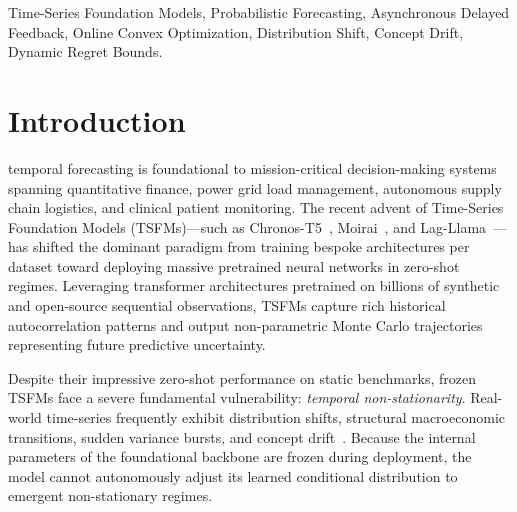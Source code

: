 \documentclass[10pt,journal,compsoc]{IEEEtran}
\begin{document}
{\begin{abstract}
RLS-TS). Evaluated through Continuous Ranked Probability Score (CRPS), Multivariate Energy Score, Variogram Score, and Circular Block Bootstrap significance testing ($B=1000, b \in \{5, 10, 20\}$), $H_3$ demonstrates statistically significant reductions in predictive error of up to 21.8\% under severe joint shifts. Furthermore, cross-architecture evaluations on Chronos-T5 and Moirai-1.0-R reveal a universal invariance: while unregularized mean tracking overfits high-frequency financial return noise, overlap-aware scale adaptation robustly improves Winkler interval coverage scores by up to 24.4\%.
\end{abstract}

\begin{IEEEkeywords}
Time-Series Foundation Models, Probabilistic Forecasting, Asynchronous Delayed Feedback, Online Convex Optimization, Distribution Shift, Concept Drift, Dynamic Regret Bounds.
\end{IEEEkeywords}}

\maketitle
\IEEEdisplaynontitleabstractindextext
\IEEEpeerreviewmaketitle

\section{Introduction}
 temporal forecasting is foundational to mission-critical decision-making systems spanning quantitative finance, power grid load management, autonomous supply chain logistics, and clinical patient monitoring. The recent advent of Time-Series Foundation Models (TSFMs)---such as Chronos-T5~\cite{ansari2024chronos}, Moirai~\cite{garza2023timegpt}, and Lag-Llama~\cite{rasul2023lagllama}---has shifted the dominant paradigm from training bespoke architectures per dataset toward deploying massive pretrained neural networks in zero-shot regimes. Leveraging transformer architectures pretrained on billions of synthetic and open-source sequential observations, TSFMs capture rich historical autocorrelation patterns and output non-parametric Monte Carlo trajectories representing future predictive uncertainty.

Despite their impressive zero-shot performance on static benchmarks, frozen TSFMs face a severe fundamental vulnerability: \emph{temporal non-stationarity}. Real-world time-series frequently exhibit distribution shifts, structural macroeconomic transitions, sudden variance bursts, and concept drift~\cite{lu2018learning, gama2014survey}. Because the internal parameters of the foundational backbone are frozen during deployment, the model cannot autonomously adjust its learned conditional distribution to emergent non-stationary regimes. 
\end{document}
